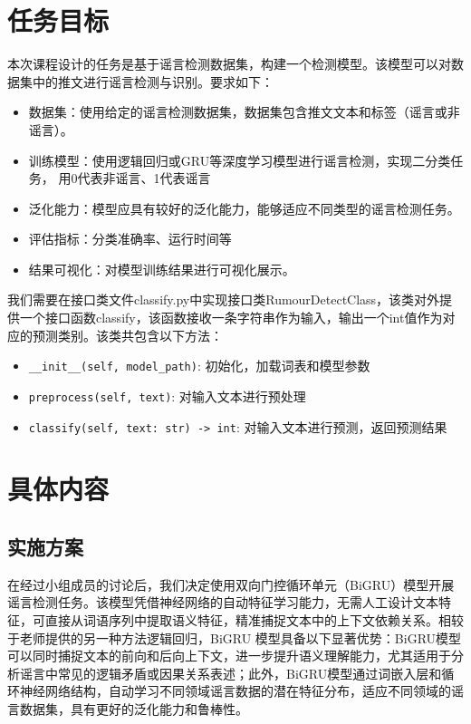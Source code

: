 \chapter{任务目标}

本次课程设计的任务是基于谣言检测数据集，构建一个检测模型。该模型可以对数据集中的推文进行谣言检测与识别。要求如下：
\begin{itemize}
    \item 数据集：使用给定的谣言检测数据集，数据集包含推文文本和标签（谣言或非谣言）。
    \item 训练模型：使用逻辑回归或GRU等深度学习模型进行谣言检测，实现二分类任务，
    用0代表非谣言、1代表谣言
    \item 泛化能力：模型应具有较好的泛化能力，能够适应不同类型的谣言检测任务。
    \item 评估指标：分类准确率、运行时间等
    \item 结果可视化：对模型训练结果进行可视化展示。
\end{itemize}

\vspace{1em}

我们需要在接口类文件classify.py中实现接口类RumourDetectClass，该类对外提供一个接口函数classify，该函数接收一条字符串作为输入，输出一个int值作为对应的预测类别。该类共包含以下方法：
\begin{itemize}
    \item \verb|__init__(self, model_path)|: 初始化，加载词表和模型参数
    \item \verb|preprocess(self, text)|: 对输入文本进行预处理
    \item \verb|classify(self, text: str) -> int|: 对输入文本进行预测，返回预测结果
\end{itemize}

\chapter{具体内容}

\section{实施方案}

在经过小组成员的讨论后，我们决定使用双向门控循环单元（BiGRU）模型开展谣言检测任务。该模型凭借神经网络的自动特征学习能力，无需人工设计文本特征，可直接从词语序列中提取语义特征，精准捕捉文本中的上下文依赖关系。相较于老师提供的另一种方法逻辑回归，BiGRU 模型具备以下显著优势：BiGRU模型可以同时捕捉文本的前向和后向上下文，进一步提升语义理解能力，尤其适用于分析谣言中常见的逻辑矛盾或因果关系表述；此外，BiGRU模型通过词嵌入层和循环神经网络结构，自动学习不同领域谣言数据的潜在特征分布，适应不同领域的谣言数据集，具有更好的泛化能力和鲁棒性。


